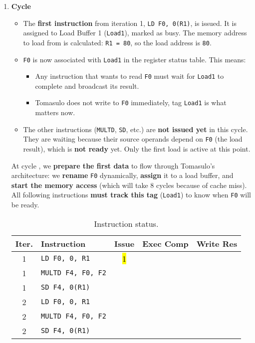 \begin{enumerate}
    \item \textbf{Cycle \theenumi}
    \begin{itemize}
        \item The \textbf{first instruction} from iteration 1, \texttt{LD F0, 0(R1)}, is issued. It is assigned to Load Buffer 1 (\texttt{Load1}), marked as busy. The memory address to load from is calculated: \texttt{R1 = 80}, so the load address is \texttt{80}.
        \item \texttt{F0} is now associated with \texttt{Load1} in the register status table. This means:
        \begin{itemize}
            \item Any instruction that wants to read \texttt{F0} must wait for \texttt{Load1} to complete and broadcast its result.
            \item Tomasulo does not write to \texttt{F0} immediately, tag \texttt{Load1} is what matters now.
        \end{itemize}
        \item The other instructions (\texttt{MULTD}, \texttt{SD}, etc.) are \textbf{not issued yet} in this cycle. They are waiting because their source operands depend on \texttt{F0} (the load result), which is \textbf{not ready} yet. Only the first load is active at this point.
    \end{itemize}
    At cycle \theenumi, we \textbf{prepare the first data} to flow through Tomasulo's architecture: we \textbf{rename} \texttt{F0} dynamically, \textbf{assign} it to a load buffer, and \textbf{start the memory access} (which will take 8 cycles because of cache miss). All following instructions \textbf{must track this tag} (\texttt{Load1}) to know when \texttt{F0} will be ready.
    \begin{table}[!htp]
        \centering
        \begin{tabular}{@{} c l | c c c @{}}
            \toprule
            Iter.       & Instruction                   & Issue & Exec Comp & Write Res \\
            \midrule
            1           & \texttt{LD    F0, 0, R1}      & \hl{1}&           &           \\ [.3em]
            1           & \texttt{MULTD F4, F0, F2}     &       &           &           \\ [.3em]
            1           & \texttt{SD    F4, 0(R1)}      &       &           &           \\ [.3em]
            2           & \texttt{LD    F0, 0, R1}      &       &           &           \\ [.3em]
            2           & \texttt{MULTD F4, F0, F2}     &       &           &           \\ [.3em]
            2           & \texttt{SD    F4, 0(R1)}      &       &           &           \\
            \bottomrule
        \end{tabular}
        \caption*{Instruction status.}
    \end{table}


\end{enumerate}

